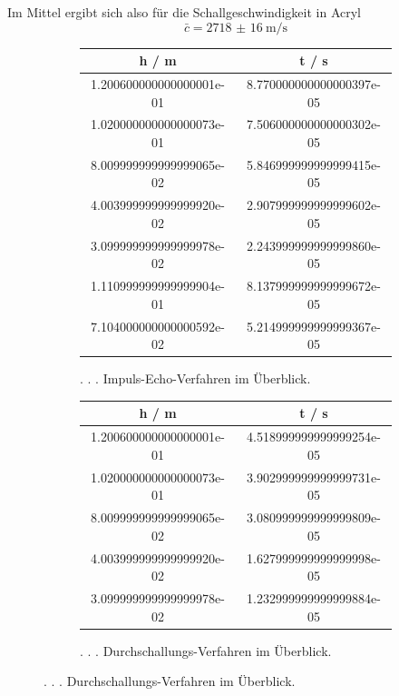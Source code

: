 Im Mittel ergibt sich also für die Schallgeschwindigkeit in Acryl
\begin{equation*}
  \bar{c} = \SI{2718(16)}{\meter \per \second}
\end{equation*}
\begin{figure}
  \centering
  \caption{Werte des . . . }
  \begin{subfigure}{0.48\textwidth}
    \caption{. . . Impuls-Echo-Verfahren im Überblick.}
    \begin{tabular}{S S}
      \toprule
      h / \si{\meter} & t / \si{\second} \\
      \midrule
      1.200600000000000001e-01 & 8.770000000000000397e-05\\
      1.020000000000000073e-01 & 7.506000000000000302e-05\\
      8.009999999999999065e-02 & 5.846999999999999415e-05\\
      4.003999999999999920e-02 & 2.907999999999999602e-05\\
      3.099999999999999978e-02 & 2.243999999999999860e-05\\
      1.110999999999999904e-01 & 8.137999999999999672e-05\\
      7.104000000000000592e-02 & 5.214999999999999367e-05\\
      \bottomrule
    \end{tabular}
    \label{tab:IE}
  \end{subfigure}
  \begin{subfigure}{0.48\textwidth}
    \caption{. . . Durchschallungs-Verfahren im Überblick.}
    \begin{tabular}{S S}
      \toprule
      h / \si{\meter} & t / \si{\second} \\
      \midrule
      1.200600000000000001e-01 & 4.518999999999999254e-05\\
      1.020000000000000073e-01 & 3.902999999999999731e-05\\
      8.009999999999999065e-02 & 3.080999999999999809e-05\\
      4.003999999999999920e-02 & 1.627999999999999998e-05\\
      3.099999999999999978e-02 & 1.232999999999999884e-05\\
      \bottomrule
    \end{tabular}
    \label{tab:DS}
  \end{subfigure}
  \label{tab:Tabs}
\end{figure}




